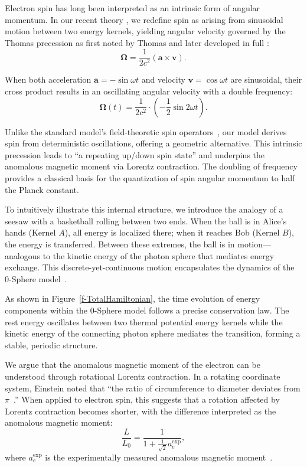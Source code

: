 \documentclass[%
 reprint,
 amsmath,amssymb,
 aps,
]{revtex4-1}
\numberwithin{equation}{section}%
\begin{document}
\vspace{0.5cm}

Electron spin has long been interpreted as an intrinsic form of angular momentum. In our recent theory \cite{hanamura2023}, we redefine spin as arising from sinusoidal motion between two energy kernels, yielding angular velocity governed by the Thomas precession as first noted by Thomas \cite{thomas1926} and later developed in full \cite{thomas1927}:
\begin{equation}
\boldsymbol{\Omega} = \frac{1}{2c^2} (\mathbf{a} \times \mathbf{v}).
\end{equation}

When both acceleration $\mathbf{a} = -\sin\omega t$ and velocity $\mathbf{v} = \cos\omega t$ are sinusoidal, their cross product results in an oscillating angular velocity with a double frequency:
\begin{equation}
\boldsymbol{\Omega}(t) = \frac{1}{2c^2} \cdot \left(-\frac{1}{2}\sin2\omega t\right).
\end{equation}

Unlike the standard model's field-theoretic spin operators~\cite{weinberg1995}, our model derives spin from deterministic oscillations, offering a geometric alternative. This intrinsic precession leads to ``a repeating up/down spin state'' and underpins the anomalous magnetic moment via Lorentz contraction. The doubling of frequency provides a classical basis for the quantization of spin angular momentum to half the Planck constant.

To intuitively illustrate this internal structure, we introduce the analogy of a seesaw with a basketball rolling between two ends. When the ball is in Alice's hands (Kernel $A$), all energy is localized there; when it reaches Bob (Kernel $B$), the energy is transferred. Between these extremes, the ball is in motion—analogous to the kinetic energy of the photon sphere that mediates energy exchange. This discrete-yet-continuous motion encapsulates the dynamics of the 0-Sphere model~\cite{hanamura2024}.

As shown in Figure~\ref{f-TotalHamiltonian}, the time evolution of energy components within the 0-Sphere model follows a precise conservation law. The rest energy oscillates between two thermal potential energy kernels while the kinetic energy of the connecting photon sphere mediates the transition, forming a stable, periodic structure.

We argue that the anomalous magnetic moment of the electron can be understood through rotational Lorentz contraction. In a rotating coordinate system, Einstein noted that ``the ratio of circumference to diameter deviates from $\pi$~\cite{einstein1912}.'' When applied to electron spin, this suggests that a rotation affected by Lorentz contraction becomes shorter, with the difference interpreted as the anomalous magnetic moment:
\begin{equation}
\frac{L}{L_0} = \frac{1}{1 + \frac{1}{\sqrt{2}}a_e^{\text{exp}}},
\label{eq:zitter_velocity}
\end{equation}
where $a_e^{\text{exp}}$ is the experimentally measured anomalous magnetic moment~\cite{fan2023}.
\end{document}
